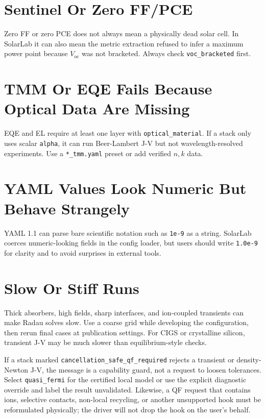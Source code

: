 \documentclass[
  11pt,
  american,
]{report}
\begin{document}
\hypertarget{sentinel-or-zero-ffpce}{%
\section{Sentinel Or Zero FF/PCE}\label{sentinel-or-zero-ffpce}}

Zero FF or zero PCE does not always mean a physically dead solar cell.
In SolarLab it can also mean the metric extraction refused to infer a
maximum power point because \(V_\mathrm{oc}\) was not bracketed. Always
check \texttt{voc\_bracketed} first.

\hypertarget{tmm-or-eqe-fails-because-optical-data-are-missing}{%
\section{TMM Or EQE Fails Because Optical Data Are
Missing}\label{tmm-or-eqe-fails-because-optical-data-are-missing}}

EQE and EL require at least one layer with \texttt{optical\_material}.
If a stack only uses scalar \texttt{alpha}, it can run Beer-Lambert J-V
but not wavelength-resolved experiments. Use a \texttt{*\_tmm.yaml}
preset or add verified \(n,k\) data.

\hypertarget{yaml-values-look-numeric-but-behave-strangely}{%
\section{YAML Values Look Numeric But Behave
Strangely}\label{yaml-values-look-numeric-but-behave-strangely}}

YAML 1.1 can parse bare scientific notation such as \texttt{1e-9} as a
string. SolarLab coerces numeric-looking fields in the config loader,
but users should write \texttt{1.0e-9} for clarity and to avoid
surprises in external tools.

\hypertarget{slow-or-stiff-runs}{%
\section{Slow Or Stiff Runs}\label{slow-or-stiff-runs}}

Thick absorbers, high fields, sharp interfaces, and ion-coupled
transients can make Radau solves slow. Use a coarse grid while
developing the configuration, then rerun final cases at publication
settings. For CIGS or crystalline silicon, transient J-V may be much
slower than equilibrium-style checks.

If a stack marked \texttt{cancellation\_safe\_qf\_required} rejects a
transient or density-Newton J-V, the message is a capability guard, not
a request to loosen tolerances. Select \texttt{quasi\_fermi} for the
certified local model or use the explicit diagnostic override and label
the result unvalidated. Likewise, a QF request that contains ions,
selective contacts, non-local recycling, or another unsupported hook
must be reformulated physically; the driver will not drop the hook on
the user's behalf.
\end{document}
